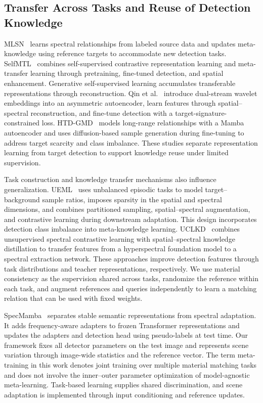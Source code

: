 \documentclass[a4paper,11pt]{article}
\begin{document}
\subsection{Transfer Across Tasks and Reuse of Detection Knowledge}
MLSN~\cite{mlsn} learns spectral relationships from labeled source data and updates meta-knowledge using reference targets to accommodate new detection tasks. SelfMTL~\cite{selfmtl} combines self-supervised contrastive representation learning and meta-transfer learning through pretraining, fine-tuned detection, and spatial enhancement. Generative self-supervised learning accumulates transferable representations through reconstruction. Qin et al.~\cite{wtgssl2025} introduce dual-stream wavelet embeddings into an asymmetric autoencoder, learn features through spatial--spectral reconstruction, and fine-tune detection with a target-signature-constrained loss. HTD-GMD~\cite{htdgmd2026} models long-range relationships with a Mamba autoencoder and uses diffusion-based sample generation during fine-tuning to address target scarcity and class imbalance. These studies separate representation learning from target detection to support knowledge reuse under limited supervision.

Task construction and knowledge transfer mechanisms also influence generalization. UEML~\cite{ueml2026} uses unbalanced episodic tasks to model target--background sample ratios, imposes sparsity in the spatial and spectral dimensions, and combines partitioned sampling, spatial--spectral augmentation, and contrastive learning during downstream adaptation. This design incorporates detection class imbalance into meta-knowledge learning. UCLKD~\cite{uclkd2025} combines unsupervised spectral contrastive learning with spatial--spectral knowledge distillation to transfer features from a hyperspectral foundation model to a spectral extraction network. These approaches improve detection features through task distributions and teacher representations, respectively. We use material consistency as the supervision shared across tasks, randomize the reference within each task, and augment references and queries independently to learn a matching relation that can be used with fixed weights.

SpecMamba~\cite{specmamba} separates stable semantic representations from spectral adaptation. It adds frequency-aware adapters to frozen Transformer representations and updates the adapters and detection head using pseudo-labels at test time. Our framework fixes all detector parameters on the test image and represents scene variation through image-wide statistics and the reference vector. The term meta-training in this work denotes joint training over multiple material matching tasks and does not involve the inner--outer parameter optimization of model-agnostic meta-learning. Task-based learning supplies shared discrimination, and scene adaptation is implemented through input conditioning and reference updates.
\end{document}
